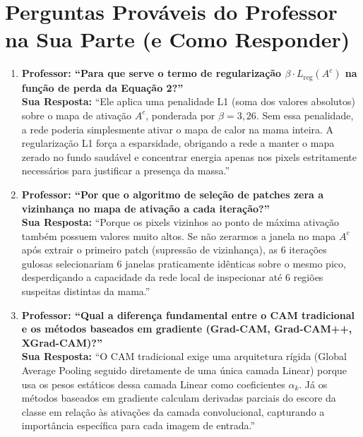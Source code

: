 \documentclass[11pt,a4paper]{article}
\begin{document}
\section*{Perguntas Prováveis do Professor na Sua Parte (e Como Responder)}

\begin{tcolorbox}[colback=qabg, colframe=qaborder, boxrule=1pt, arc=4pt, title={\bfseries Preparação para Arguição — Parte 2 (Hermeson)}]
\begin{enumerate}[leftmargin=*, itemsep=6pt]
    \item \textbf{Professor: ``Para que serve o termo de regularização $\beta \cdot L_{\text{reg}}(A^c)$ na função de perda da Equação 2?''}\\
    \textbf{Sua Resposta:} ``Ele aplica uma penalidade L1 (soma dos valores absolutos) sobre o mapa de ativação $A^c$, ponderada por $\beta = 3{,}26$. Sem essa penalidade, a rede poderia simplesmente ativar o mapa de calor na mama inteira. A regularização L1 força a esparsidade, obrigando a rede a manter o mapa zerado no fundo saudável e concentrar energia apenas nos pixels estritamente necessários para justificar a presença da massa.''

    \item \textbf{Professor: ``Por que o algoritmo de seleção de patches zera a vizinhança no mapa de ativação a cada iteração?''}\\
    \textbf{Sua Resposta:} ``Porque os pixels vizinhos ao ponto de máxima ativação também possuem valores muito altos. Se não zerarmos a janela no mapa $A^c$ após extrair o primeiro patch (supressão de vizinhança), as 6 iterações gulosas selecionariam 6 janelas praticamente idênticas sobre o mesmo pico, desperdiçando a capacidade da rede local de inspecionar até 6 regiões suspeitas distintas da mama.''

    \item \textbf{Professor: ``Qual a diferença fundamental entre o CAM tradicional e os métodos baseados em gradiente (Grad-CAM, Grad-CAM++, XGrad-CAM)?''}\\
    \textbf{Sua Resposta:} ``O CAM tradicional exige uma arquitetura rígida (Global Average Pooling seguido diretamente de uma única camada Linear) porque usa os pesos estáticos dessa camada Linear como coeficientes $\alpha_k$. Já os métodos baseados em gradiente calculam derivadas parciais do escore da classe em relação às ativações da camada convolucional, capturando a importância específica para cada imagem de entrada.''
\end{enumerate}
\end{tcolorbox}
\end{document}
